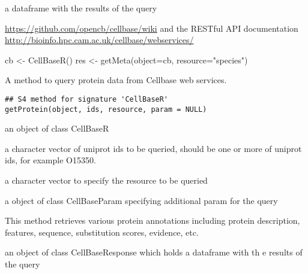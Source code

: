 \documentclass[letterpaper]{book}
\begin{document}
%
\begin{Value}
a dataframe with the
results of the query
\end{Value}
%
\begin{SeeAlso}\relax
\url{https://github.com/opencb/cellbase/wiki} 
and the RESTful API documentation 
\url{http://bioinfo.hpc.cam.ac.uk/cellbase/webservices/}
\end{SeeAlso}
%
\begin{Examples}
\begin{ExampleCode}
   cb <- CellBaseR()
   res <- getMeta(object=cb, resource="species")
\end{ExampleCode}
\end{Examples}
%
\begin{Description}\relax
A method to query protein data from Cellbase web services.
\end{Description}
%
\begin{Usage}
\begin{verbatim}
## S4 method for signature 'CellBaseR'
getProtein(object, ids, resource, param = NULL)
\end{verbatim}
\end{Usage}
%
\begin{Arguments}
\begin{ldescription}
\item[\code{object}] an object of class CellBaseR

\item[\code{ids}] a character vector of uniprot ids to be queried, should be one
or more of uniprot ids, for example O15350.

\item[\code{resource}] a character vector to specify the resource to be queried

\item[\code{param}] a object of class CellBaseParam specifying additional param
for the query
\end{ldescription}
\end{Arguments}
%
\begin{Details}\relax
This method retrieves various protein annotations including 
protein description, features, sequence, substitution scores, evidence,  etc.
\end{Details}
%
\begin{Value}
an object of class CellBaseResponse which holds a dataframe with th
e results of the query
\end{Value}
\end{document}
